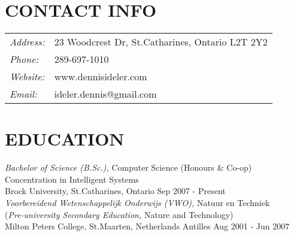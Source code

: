 \documentclass[margin]{res}
\begin{document}
\begin{resume}

\section{CONTACT INFO} %
\begin{tabular}{l l}
  {\sl Address:} & 23 Woodcrest Dr, St.\hspace{2 pt}Catharines, Ontario L2T 2Y2 \\
  {\sl Phone:} & 289-697-1010 \\
  {\sl Website:} & www.dennisideler.com \\
  {\sl Email:} & ideler.dennis@gmail.com
\end{tabular} 



\section{EDUCATION}
  {\sl Bachelor of Science (B.Sc.),} Computer Science (Honours \& Co-op) \\
  Concentration in Intelligent Systems \\
  Brock University, St.\hspace{2 pt}Catharines, Ontario
  \hfill Sep 2007 - Present \\
                
  {\sl Voorbereidend Wetenschappelijk Onderwijs (VWO),} Natuur en Techniek \\
  ({\sl Pre-university Secondary Education,} Nature and Technology) \\
  Milton Peters College, St.\hspace{2 pt}Maarten, Netherlands Antilles
  \hfill Aug 2001 - Jun 2007 \\


\end{resume}
\end{document}
